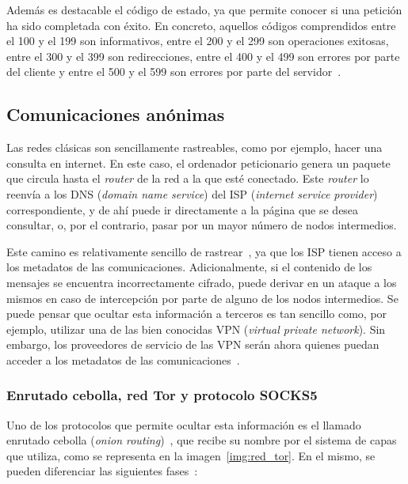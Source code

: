 Además es destacable el código de estado, ya que permite conocer si una petición ha sido completada con éxito. En concreto, aquellos códigos comprendidos entre el 100 y el 199 son informativos, entre el 200 y el 299 son operaciones exitosas, entre el 300 y el 399 son redirecciones, entre el 400 y el 499 son errores por parte del cliente y entre el 500 y el 599 son errores por parte del servidor~\cite{httpStatus}.


\subsection{Comunicaciones anónimas}

Las redes clásicas son sencillamente rastreables, como por ejemplo, hacer una consulta en internet. En este caso, el ordenador peticionario genera un paquete que circula hasta el \textit{router} de la red a la que esté conectado. Este \textit{router} lo reenvía a los DNS (\textit{domain name service}) del ISP (\textit{internet service provider}) correspondiente, y de ahí puede ir directamente a la página que se desea consultar, o, por el contrario, pasar por un mayor número de nodos intermedios.

Este camino es relativamente sencillo de rastrear~\cite{TorAndrea2022}, ya que los ISP tienen acceso a los metadatos de las comunicaciones. Adicionalmente, si el contenido de los mensajes se encuentra incorrectamente cifrado, puede derivar en un ataque a los mismos en caso de intercepción por parte de alguno de los nodos intermedios. Se puede pensar que ocultar esta información a terceros es tan sencillo como, por ejemplo, utilizar una de las bien conocidas VPN (\textit{virtual private network}). Sin embargo, los proveedores de servicio de las VPN serán ahora quienes puedan acceder a los metadatos de las comunicaciones~\cite{TorKeepCoding2022}.


\subsubsection{Enrutado cebolla, red Tor y protocolo SOCKS5}

Uno de los protocolos que permite ocultar esta información es el llamado enrutado cebolla (\textit{onion routing})~\cite{TorAvast2022}, que recibe su nombre por el sistema de capas que utiliza, como se representa en la imagen~\ref{img:red_tor}. En el mismo, se pueden diferenciar las siguientes fases~\cite{TorKeepCoding2022}: 


